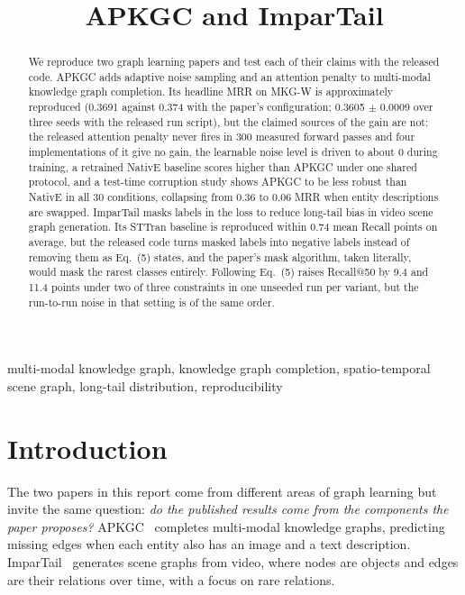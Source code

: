 \documentclass[conference,a4paper]{IEEEtran}
\begin{document}

\setcounter{page}{1}

\title{APKGC and ImparTail}
\author{
}
\maketitle

\begin{abstract}
We reproduce two graph learning papers and test each of their claims with the released
code. APKGC adds adaptive noise sampling and an attention penalty to multi-modal knowledge
graph completion. Its headline MRR on MKG-W is approximately reproduced (0.3691 against
0.374 with the paper's configuration; 0.3605 $\pm$ 0.0009 over three seeds with the
released run script), but the claimed sources of the gain are not: the released attention
penalty never fires in 300 measured forward passes and four implementations of it give no
gain, the learnable noise level is driven to about 0 during training, a retrained NativE
baseline scores higher than APKGC under one shared protocol, and a test-time corruption
study shows APKGC to be less robust than NativE in all 30 conditions, collapsing from 0.36
to 0.06 MRR when entity descriptions are swapped. ImparTail masks labels in the loss to
reduce long-tail bias in video scene graph generation. Its STTran baseline is reproduced
within 0.74 mean Recall points on average, but the released code turns masked labels into
negative labels instead of removing them as Eq.~(5) states, and the paper's mask algorithm,
taken literally, would mask the rarest classes entirely. Following Eq.~(5) raises
Recall@50 by 9.4 and 11.4 points under two of three constraints in one unseeded run per
variant, but the run-to-run noise in that setting is of the same order.
\end{abstract}

\begin{IEEEkeywords}
multi-modal knowledge graph, knowledge graph completion, spatio-temporal scene graph, long-tail distribution, reproducibility
\end{IEEEkeywords}

\section{Introduction}
The two papers in this report come from different areas of graph learning but invite
the same question: \emph{do the published results come from the components the paper
proposes?} APKGC~\cite{apkgc} completes multi-modal knowledge graphs, predicting missing
edges when each entity also has an image and a text description. ImparTail~\cite{impartail}
generates scene graphs from video, where nodes are objects and edges are their relations
over time, with a focus on rare relations.
\end{document}
